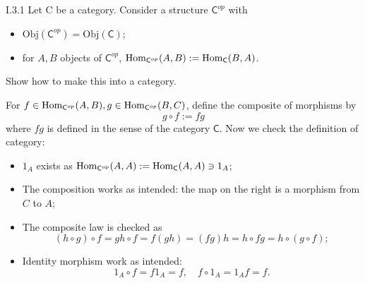 \section{}
\begin{problem}{I.3.1}
Let \textsf{C} be a category. Consider a structure $\mathsf{C}^{op}$ with
\begin{itemize}
\setlength\itemsep{0pc}
\item $\text{Obj}(\mathsf{C}^{op}) = \text{Obj}(\mathsf{C})$;
\item for $A, B$ objects of $\mathsf{C}^{op}$, $\operatorname{Hom}_{\mathsf{C}^{op}}(A,B) := \operatorname{Hom}_\mathsf{C}(B,A)$.
\end{itemize}
Show how to make this into a category.
\end{problem}
\begin{solution}
For $f \in \operatorname{Hom}_{\mathsf{C}^{op}}(A,B), g \in \operatorname{Hom}_{\mathsf{C}^{op}}(B,C)$, define the composite of morphisms by
\[
g \circ f := fg     
\]
where $fg$ is defined in the sense of the category $\mathsf{C}$. Now we check the definition of category:
\begin{itemize}
\setlength\itemsep{0pt}
\item $1_A$ exists as $\operatorname{Hom}_{\mathsf{C}^{op}}(A,A) := \operatorname{Hom}_\mathsf{C}(A,A) \ni 1_A$; 
\item The composition works as intended: the map on the right is a morphism from $C$ to $A$;
\item The composite law is checked as
\[
(h \circ g) \circ f = gh \circ f = f(gh) = (fg)h = h \circ fg = h \circ (g \circ f);
\]
\item Identity morphism work as intended:
\[
1_A \circ f = f1_A = f, \quad f \circ 1_A = 1_Af = f.	
\]
\end{itemize}
\end{solution}

